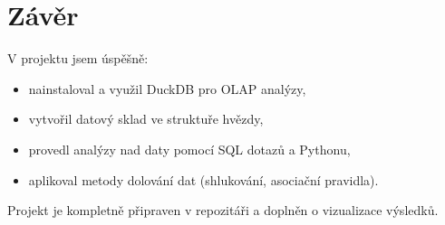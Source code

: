\documentclass[a4paper,12pt]{article}
\begin{document}
\section{Závěr}
V projektu jsem úspěšně:
\begin{itemize}
    \item nainstaloval a využil DuckDB pro OLAP analýzy,
    \item vytvořil datový sklad ve struktuře hvězdy,
    \item provedl analýzy nad daty pomocí SQL dotazů a Pythonu,
    \item aplikoval metody dolování dat (shlukování, asociační pravidla).
\end{itemize}

Projekt je kompletně připraven v repozitáři a doplněn o vizualizace výsledků.
\end{document}

